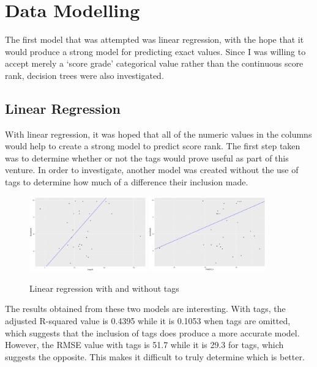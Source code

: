 \documentclass[models.tex]{subfiles}
\begin{document}
\section{Data Modelling} %
\label{sec:models}
The first model that was attempted was linear regression, with the hope that it
would produce a strong model for predicting exact values. Since I was willing to
accept merely a `score grade' categorical value rather than the continuous score
rank, decision trees were also investigated.

\subsection{Linear Regression} %
\label{sub:linear_regression}
With linear regression, it was hoped that all of the numeric values in the
columns would help to create a strong model to predict score rank. The first
step taken was to determine whether or not the tags would prove useful as part
of this venture. In order to investigate, another model was created without the
use of tags to determine how much of a difference their inclusion made.

\begin{figure}[H]
    \centering
    \includegraphics[width=0.45\textwidth]{img/pred.png}
    \includegraphics[width=0.45\textwidth]{img/pred_b.png}
    \caption{Linear regression with and without tags}
\end{figure}

The results obtained from these two models are interesting. With tags, the
adjusted R-squared value is 0.4395 while it is 0.1053 when tags are omitted,
which suggests that the inclusion of tags does produce a more accurate model.
However, the RMSE value with tags is 51.7 while it is 29.3 for tags, which
suggests the opposite. This makes it difficult to truly determine which is
better.
\end{document}
